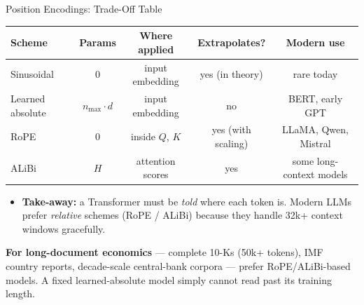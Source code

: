 \begin{frame}{Position Encodings: Trade-Off Table}
\begin{center}
\renewcommand{\arraystretch}{1.25}
\begin{tabular}{l c c c c}
\toprule
\textbf{Scheme} & \textbf{Params} & \textbf{Where applied} & \textbf{Extrapolates?} & \textbf{Modern use} \\
\midrule
Sinusoidal       & 0       & input embedding & yes (in theory) & rare today \\
Learned absolute & $n_{\max}\!\cdot\! d$ & input embedding & no & BERT, early GPT \\
RoPE             & 0       & inside $Q$, $K$ & yes (with scaling) & LLaMA, Qwen, Mistral \\
ALiBi            & $H$     & attention scores & yes & some long-context models \\
\bottomrule
\end{tabular}
\end{center}

\medskip
\begin{itemize}
\item \textbf{Take-away:} a Transformer must be \emph{told} where each token is. Modern LLMs prefer \emph{relative} schemes (RoPE / ALiBi) because they handle 32k+ context windows gracefully.
\end{itemize}
\medskip
\begin{takeawaybox}
\textbf{For long-document economics} --- complete 10-Ks (50k+ tokens), IMF country reports, decade-scale central-bank corpora --- prefer RoPE/ALiBi-based models. A fixed learned-absolute model simply cannot read past its training length.
\end{takeawaybox}
\end{frame}

